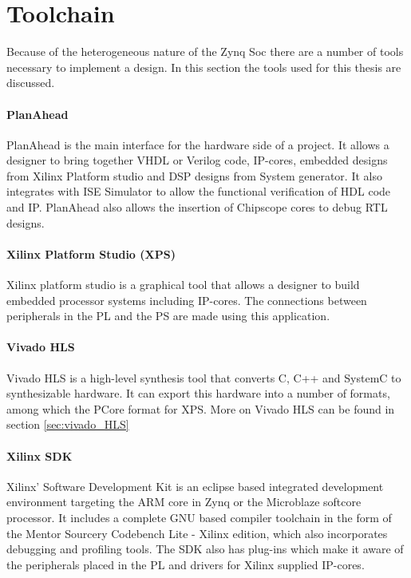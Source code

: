 \section{Toolchain}
Because of the heterogeneous nature of the Zynq Soc there are a number of tools necessary to implement a design. In this section the tools used for this thesis are discussed.

\paragraph{PlanAhead} PlanAhead is the main interface for the hardware side of a project. It allows a designer to bring together VHDL or Verilog code, IP-cores, embedded designs from Xilinx Platform studio and DSP designs from System generator. It also integrates with ISE Simulator to allow the functional verification of HDL code and IP. PlanAhead also allows the insertion of Chipscope cores to debug RTL designs.

\paragraph{Xilinx Platform Studio (XPS)} Xilinx platform studio is a graphical tool that allows a designer to build embedded processor systems including IP-cores. The connections between peripherals in the PL and the PS are made using this application.

\paragraph{Vivado HLS} Vivado HLS is a high-level synthesis tool that converts C, C++ and SystemC to synthesizable hardware. It can export this hardware into a number of formats, among which the PCore format for XPS. More on Vivado HLS can be found in section \ref{sec:vivado_HLS}

\paragraph{Xilinx SDK} Xilinx' Software Development Kit is an eclipse based integrated development environment targeting the ARM core in Zynq or the Microblaze softcore processor. It includes a complete GNU based compiler toolchain in the form of the Mentor Sourcery Codebench Lite - Xilinx edition, which also incorporates debugging and profiling tools. The SDK also has plug-ins which make it aware of the peripherals placed in the PL and drivers for Xilinx supplied IP-cores.


